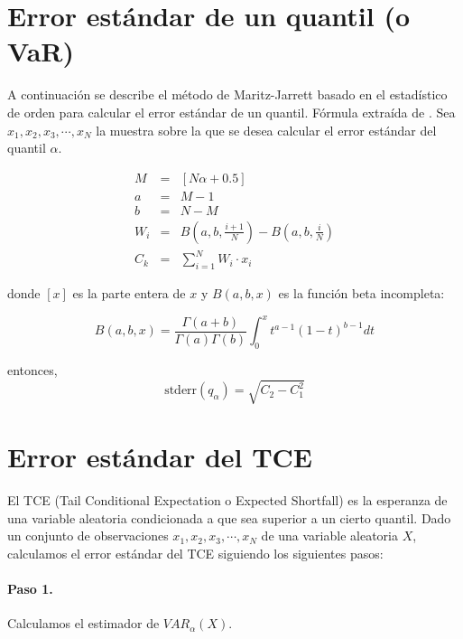 
\section{Error est\'andar de un quantil (o VaR)}
\label{apendix:stderrvar}

A continuaci\'on se describe el m\'etodo de Maritz-Jarrett basado en el
estad\'istico de orden para calcular el error est\'andar de un quantil.
F\'ormula extra\'ida de \cite{quant:algor}. Sea $x_1, x_2, x_3, \cdots, x_N$
la muestra sobre la que se desea calcular el error est\'andar del quantil $\alpha$.

\begin{eqnarray}
M   & = & [N \alpha + 0.5] \nonumber \\
a   & = & M - 1 \nonumber \\
b   & = & N - M \nonumber \\
W_i & = & B(a,b,\frac{i+1}{N}) - B(a,b,\frac{i}{N}) \nonumber \\
C_k & = & \sum_{i=1}^{N} W_i \cdot x_i \nonumber
\end{eqnarray}

donde $[x]$ es la parte entera de $x$  y $B(a,b,x)$ es la funci\'on
beta incompleta:

\begin{displaymath}
B(a,b,x)=\frac{\Gamma(a+b)}{\Gamma(a)\Gamma(b)}\int_0^x t^{a-1} (1-t)^{b-1} dt
\end{displaymath}

entonces,
\begin{displaymath}
\textrm{stderr}(q_{\alpha}) = \sqrt{C_2 - C_1^2}
\end{displaymath}


\section{Error est\'andar del TCE}
\label{apendix:stderrtce}

El TCE (Tail Conditional Expectation o Expected Shortfall) es la esperanza
de una variable aleatoria condicionada a que sea superior a un cierto quantil.
Dado un conjunto de observaciones $x_1, x_2, x_3, \cdots, x_N$ de una variable
aleatoria $X$, calculamos el error est\'andar del TCE siguiendo los siguientes
pasos:

\paragraph{Paso 1.} Calculamos el estimador de $VAR_{\alpha}(X)$.

